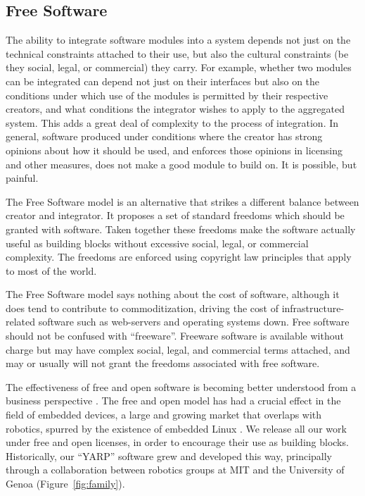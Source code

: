 \subsection{Free Software}

The ability to integrate software modules into a system
depends not just on the technical constraints attached
to their use, but also the cultural constraints
(be they social, legal, or commercial) they carry.
%
For example, whether two modules can be integrated
can depend not just on their interfaces but also on
the conditions under which use of the modules
is permitted by their respective creators,
and what conditions the integrator wishes to 
apply to the aggregated system.  
%
This adds a great deal of complexity to the process
of integration.
%
In general, software produced under conditions where the 
creator has strong opinions about how it should be 
used, and enforces those opinions in licensing
and other measures, does not make a good module 
to build on.
%
It is possible, but painful.

The Free Software model is an alternative that strikes a different
balance between creator and integrator.  It proposes a set of standard
freedoms which should be granted with software. Taken together 
these freedoms make
the software actually useful as building blocks without excessive
social, legal, or commercial complexity.  The freedoms are enforced using
copyright law principles that apply to most of the world.

The Free Software model says nothing about the cost of software,
although it does tend to contribute to commoditization, driving the
cost of infrastructure-related software such as web-servers and
operating systems down.  Free software should not be confused with
``freeware''.  Freeware software is available without charge but may
have complex social, legal, and commercial terms attached, and may
or usually will not grant the freedoms associated with free software.

The effectiveness of free and open software is 
becoming better understood from a business
perspective \cite{vonkrogh2006promise}.
%
The free and open model has had a crucial 
effect in the field of embedded devices,
a large and growing market that overlaps
with robotics, spurred by the existence
of embedded Linux \cite{henkel2006selective}.
%
We release all our work under free and open licenses, in order to
encourage their use as building blocks.  Historically, our ``YARP''
software grew and developed this way, principally through a
collaboration between robotics groups at MIT and the University of
Genoa (Figure~\ref{fig:family}).



